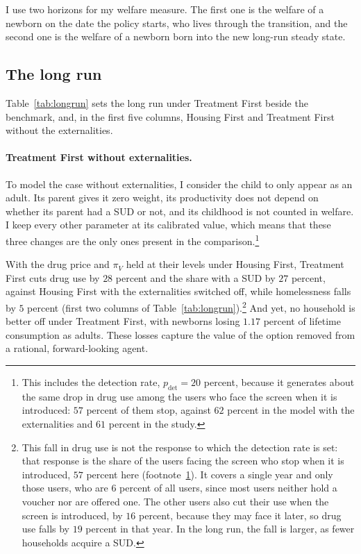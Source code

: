 \documentclass[10pt]{article}
\begin{document}
  I use two horizons for my welfare measure. The first one is the welfare of a newborn on the date the policy starts, who lives through the transition, and the second one is the welfare of a newborn born into the new long-run steady state.

\subsection{The long run}\label{sec:longrun}

Table~\ref{tab:longrun} sets the long run under Treatment First beside the benchmark, and, in the first five columns, Housing First and Treatment First without the externalities.

\paragraph{Treatment First without externalities.}   To model the case without externalities, I consider the child to only appear as an adult. Its parent gives it zero weight, its productivity does not depend on whether its parent had a SUD or not, and its childhood is not counted in welfare. I keep every other parameter at its calibrated value, which means that these three changes are the only ones present in the comparison.\footnote{\label{fn:nxpdet}This includes the detection rate, $p_{\mathrm{det}}=20$ percent, because it generates about the same drop in drug use among the users who face the screen when it is introduced: $57$ percent of them stop, against $62$ percent in the model with the externalities and $61$ percent in the study.}

With the drug price and $\pi_V$ held at their levels under Housing First, Treatment First cuts drug use by $28$ percent and the share with a SUD by $27$ percent, against Housing First with the externalities switched off, while homelessness falls by $5$ percent (first two columns of Table~\ref{tab:longrun}).\footnote{\label{fn:pe61}This fall in drug use is not the response to which the detection rate is set: that response is the share of the users facing the screen who stop when it is introduced, $57$ percent here (footnote~\ref{fn:nxpdet}). It covers a single year and only those users, who are $6$ percent of all users, since most users neither hold a voucher nor are offered one. The other users also cut their use when the screen is introduced, by $16$ percent, because they may face it later, so drug use falls by $19$ percent in that year. In the long run, the fall is larger, as fewer households acquire a SUD.} And yet, no household is better off under Treatment First, with newborns losing $1.17$ percent of lifetime consumption as adults. These losses capture the value of the option removed from a rational, forward-looking agent.
\end{document}
